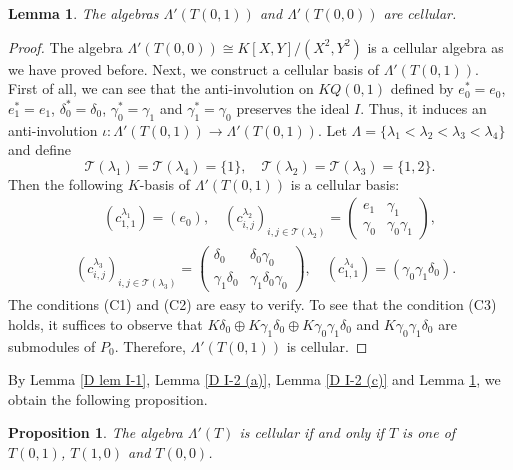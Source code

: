 \documentclass[12pt]{amsart}
\newtheorem{lem}[thm]{Lemma}
\newtheorem{prop}[thm]{Proposition}
\numberwithin{equation}{thm}
\newcommand\cT{\mathcal{T}}
\newcommand\la{\lambda}
\begin{document}
\begin{lem}
\label{D I-2 (d)(e)}
The algebras $\Lambda'(T(0,1))$ and $\Lambda'(T(0,0))$ are cellular.
\end{lem}
\begin{proof}
The algebra $\Lambda'(T(0,0))\cong K[X,Y]/(X^2,Y^2)$ is a cellular algebra as we have proved before. 
Next, we construct a cellular basis of $\Lambda'(T(0,1))$. 
First of all, we can see that the anti-involution on $KQ(0,1)$ defined by
$e_0^*=e_0$, $e_1^*=e_1$, $\delta_0^{\ast}=\delta_0$, $\gamma_0^{\ast}=\gamma_1$ and $\gamma_1^{\ast}=\gamma_0$ 
preserves the ideal $I$. Thus, it induces an anti-involution $\iota:\Lambda'(T(0,1)) \to \Lambda'(T(0,1))$. 
Let $\Lambda=\{\lambda_1 < \lambda_2 < \lambda_3 < \lambda_4\}$ and define
\[  \cT(\lambda_1)=\cT(\lambda_4)=\{1\}, \quad \cT(\lambda_2)=\cT(\lambda_3)=\{1,2\}. \]
Then the following $K$-basis of $\Lambda'(T(0,1))$ is a cellular basis:
\begin{align*}
 & \qquad (c^{\lambda_1}_{1,1})=(e_0), \quad (c^{\lambda_2}_{i,j})_{i,j\in\cT(\la_2)}=
\begin{pmatrix} e_1 & \gamma_1 \\ \gamma_0 & \gamma_0\gamma_1 \end{pmatrix}, \\
&(c^{\lambda_3}_{i,j})_{i,j\in\cT(\la_3)}=
\begin{pmatrix} \delta_0 & \delta_0\gamma_0 \\ \gamma_1\delta_0 & \gamma_1\delta_0\gamma_0 \end{pmatrix},  
\quad (c^{\lambda_4}_{1,1})=(\gamma_0\gamma_1\delta_0). 
\end{align*}
The conditions (C1) and (C2) are easy to verify. To see that the condition (C3) holds, 
it suffices to observe that 
$K\delta_0\oplus K\gamma_1\delta_0\oplus K\gamma_0\gamma_1\delta_0$ and $K\gamma_0\gamma_1\delta_0$ are 
submodules of $P_0$.
Therefore, $\Lambda'(T(0,1))$ is cellular.
\end{proof}

By Lemma \ref{D lem I-1}, Lemma \ref{D I-2 (a)}, Lemma \ref{D I-2 (c)} and Lemma \ref{D I-2 (d)(e)},
we obtain the following proposition.
\begin{prop}
\label{D I-2 cellular}
The algebra $\Lambda'(T)$ is cellular if and only if $T$ is one of $T(0,1)$, $T(1,0)$ and $T(0,0)$.
\end{prop}
\end{document}
